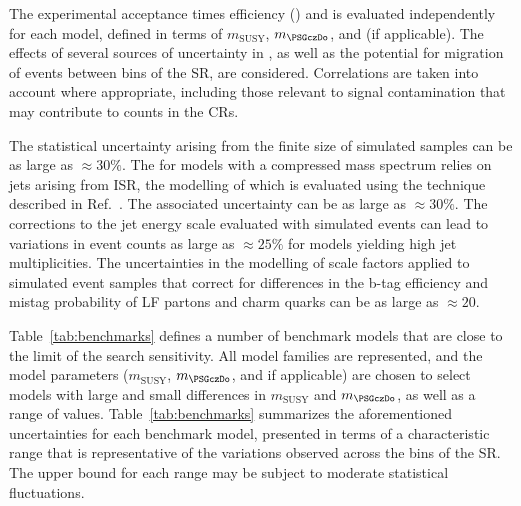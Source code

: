 The experimental acceptance times efficiency (\ate) and is evaluated
independently for each model, defined in terms of $m_\text{SUSY}$,
$m_{\PSGczDo}$, and \ctau (if applicable). 
The effects of several sources of uncertainty in \ate, as well as the
potential for migration of events between bins of the SR, are
considered. Correlations are taken into account where appropriate,
including those relevant to signal contamination that may contribute
to counts in the CRs. 

The statistical uncertainty arising from the finite size of simulated
samples can be as large as ${\approx}30\%$. The \ate for models with a
compressed mass spectrum relies on jets arising from ISR, the
modelling of which is evaluated 
using the technique described in Ref.~\cite{single-lepton-stop}. The
associated uncertainty can be as large as ${\approx}30\%$.
The corrections to the jet energy scale evaluated with simulated
events can lead to variations in event counts as large as
${\approx}25\%$ for models yielding high jet multiplicities. 
The uncertainties in the modelling of scale factors applied to
simulated event samples that correct for differences in the b-tag
efficiency
and mistag probability of LF partons and charm quarks
can be as large as ${\approx}20$.

Table~\ref{tab:benchmarks} defines a number of benchmark models that
are close to the limit of the search sensitivity. %
All model families %
are represented, and the model parameters ($m_\text{SUSY}$,
$m_{\PSGczDo}$, and \ctau if applicable) are chosen to select models
with large and small differences in $m_\text{SUSY}$ and
$m_{\PSGczDo}$, as well as a range of \ctau values. 
Table~\ref{tab:benchmarks} summarizes the aforementioned uncertainties
for each benchmark model, presented in terms of a characteristic range
that is representative of the variations observed across the bins of
the SR. The upper bound for each range may be subject to moderate
statistical fluctuations.

